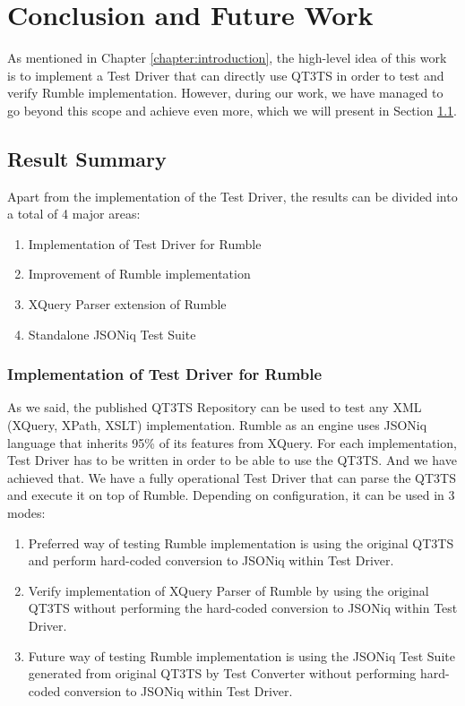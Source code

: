 \chapter{Conclusion and Future Work} 
\label{chapter:conclusions}
As mentioned in Chapter \ref{chapter:introduction}, the high-level idea of this work is to implement a Test Driver that can directly use QT3TS in order to test and verify Rumble implementation. However, during our work, we have managed to go beyond this scope and achieve even more, which we will present in Section \ref{sec:overallsummary}.

\section{Result Summary}
\label{sec:overallsummary}
Apart from the implementation of the Test Driver, the results can be divided into a total of 4 major areas:
\begin{enumerate}
	\item Implementation of Test Driver for Rumble
	\item Improvement of Rumble implementation
	\item XQuery Parser extension of Rumble
	\item Standalone JSONiq Test Suite
\end{enumerate}

\subsection{Implementation of Test Driver for Rumble}
As we said, the published QT3TS Repository \cite{TestSuiteGitHubRepository} can be used to test any XML (XQuery, XPath, XSLT) implementation. Rumble as an engine uses JSONiq language that inherits 95\% of its features from XQuery. For each implementation, Test Driver has to be written in order to be able to use the QT3TS. And we have achieved that. We have a fully operational Test Driver that can parse the QT3TS and execute it on top of Rumble. Depending on configuration, it can be used in 3 modes:
\begin{enumerate}
	\item Preferred way of testing Rumble implementation is using the original QT3TS and perform hard-coded conversion to JSONiq within Test Driver.
	\item  Verify implementation of XQuery Parser of Rumble by using the original QT3TS without performing the hard-coded conversion to JSONiq within Test Driver.
	\item Future way of testing Rumble implementation is using the JSONiq Test Suite generated from original QT3TS by Test Converter without performing hard-coded conversion to JSONiq within Test Driver.
\end{enumerate} 

